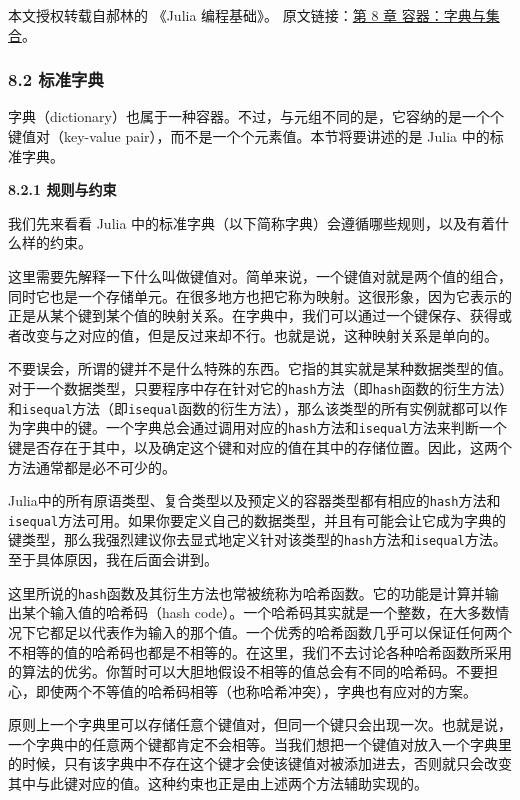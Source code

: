
本文授权转载自郝林的 《Julia 编程基础》。 原文链接：\href{https://github.com/hyper0x/JuliaBasics/blob/master/book/ch08.md}{第 8 章 容器：字典与集合}。


\subsubsection{8.2 标准字典}

字典（dictionary）也属于一种容器。不过，与元组不同的是，它容纳的是一个个键值对（key-value pair），而不是一个个元素值。本节将要讲述的是 Julia 中的标准字典。

\textbf{8.2.1 规则与约束}

我们先来看看 Julia 中的标准字典（以下简称字典）会遵循哪些规则，以及有着什么样的约束。

这里需要先解释一下什么叫做键值对。简单来说，一个键值对就是两个值的组合，同时它也是一个存储单元。在很多地方也把它称为映射。这很形象，因为它表示的正是从某个键到某个值的映射关系。在字典中，我们可以通过一个键保存、获得或者改变与之对应的值，但是反过来却不行。也就是说，这种映射关系是单向的。

不要误会，所谓的键并不是什么特殊的东西。它指的其实就是某种数据类型的值。对于一个数据类型，只要程序中存在针对它的\verb|hash|方法（即\verb|hash|函数的衍生方法）和\verb|isequal|方法（即\verb|isequal|函数的衍生方法），那么该类型的所有实例就都可以作为字典中的键。一个字典总会通过调用对应的\verb|hash|方法和\verb|isequal|方法来判断一个键是否存在于其中，以及确定这个键和对应的值在其中的存储位置。因此，这两个方法通常都是必不可少的。

Julia中的所有原语类型、复合类型以及预定义的容器类型都有相应的\verb|hash|方法和\verb|isequal|方法可用。如果你要定义自己的数据类型，并且有可能会让它成为字典的键类型，那么我强烈建议你去显式地定义针对该类型的\verb|hash|方法和\verb|isequal|方法。至于具体原因，我在后面会讲到。

这里所说的\verb|hash|函数及其衍生方法也常被统称为哈希函数。它的功能是计算并输出某个输入值的哈希码（hash code）。一个哈希码其实就是一个整数，在大多数情况下它都足以代表作为输入的那个值。一个优秀的哈希函数几乎可以保证任何两个不相等的值的哈希码也都是不相等的。在这里，我们不去讨论各种哈希函数所采用的算法的优劣。你暂时可以大胆地假设不相等的值总会有不同的哈希码。不要担心，即使两个不等值的哈希码相等（也称哈希冲突），字典也有应对的方案。

原则上一个字典里可以存储任意个键值对，但同一个键只会出现一次。也就是说，一个字典中的任意两个键都肯定不会相等。当我们想把一个键值对放入一个字典里的时候，只有该字典中不存在这个键才会使该键值对被添加进去，否则就只会改变其中与此键对应的值。这种约束也正是由上述两个方法辅助实现的。

